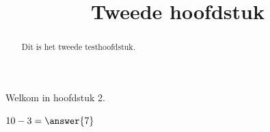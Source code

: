 \documentclass{ximera}
\title{Tweede hoofdstuk}
\begin{document}
\begin{abstract}
Dit is het tweede testhoofdstuk.
\end{abstract}

\maketitle

Welkom in hoofdstuk 2.

\begin{exercise}
\(10-3=\answer{7}\)
\end{exercise}
\end{document}
